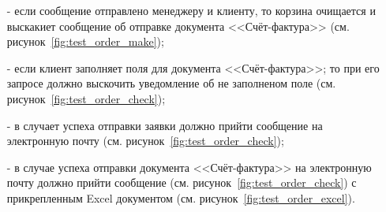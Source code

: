 \begin{itemize}
    \item[-] если сообщение отправлено менеджеру и клиенту,
    то корзина очищается и выскакиет сообщение об отправке документа <<Счёт-фактура>> (см. рисунок~\ref{fig:test_order_make});
    \item[-] если клиент заполняет поля для документа <<Счёт-фактура>>;
    то при его запросе должно выскочить уведомление об не заполненом поле (см. рисунок~\ref{fig:test_order_check});
    \item[-] в случает успеха отправки заявки должно прийти сообщение на электронную почту (см. рисунок~\ref{fig:test_order_check});
    \item[-] в случае успеха отправки документа <<Счёт-фактура>> на электронную почту должно прийти сообщение (см. рисунок~\ref{fig:test_order_check})
    с прикрепленным Excel документом (см. рисунок~\ref{fig:test_order_excel}).
\end{itemize}








